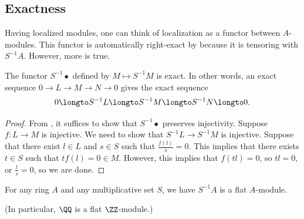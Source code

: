 \subsection{Exactness}
Having localized modules, one can think of localization
as a functor between $A$-modules.
This functor is automatically right-exact
by 
because it is tensoring with $S^{-1}A$.
However, more is true.
\begin{theorem}
    \label{thm:localization_exact}
    The functor $S^{-1}\bullet$
    defined by $M\mapsto S^{-1}M$ is exact.
    In other words, an exact sequence 
    $0\to L\to M\to N\to 0$ gives the exact sequence
    $$0\longto S^{-1}L\longto S^{-1}M\longto S^{-1}N\longto 0.$$
\end{theorem}
\begin{proof}
    From ,
    it suffices to show that $S^{-1}\bullet$
    preserves injectivity.
    Suppose $f : L\to M$ is injective.
    We need to show that $S^{-1}L\to S^{-1}M$ is injective.
    Suppose that there exist $l\in L$ and $s\in S$
    such that $\frac{f(l)}{s} = 0$.
    This implies that there exists $t\in S$ such that
    $tf(l)=0\in M$. 
    However, this implies that $f(tl)=0$, so $tl=0$,
    or $\frac ls=0$, so we are done.
\end{proof}
\begin{corollary}
    \label{cor:localization_flat}
    For any ring $A$ and any multiplicative set $S$,
    we have $S^{-1}A$ is a flat $A$-module.
\end{corollary}
(In particular, $\QQ$ is a flat $\ZZ$-module.)
%
%
%

